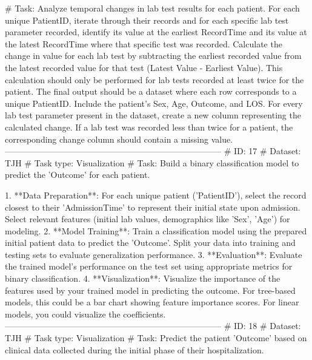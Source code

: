 \begin{tcolorbox}[colback=cadmiumgreen!5!white,colframe=forestgreen!75!white,breakable,title=\textit{Generated analytical tasks in task 4.}]
\begin{VerbatimWrap}
# Task: Analyze temporal changes in lab test results for each patient. For each unique PatientID, iterate through their records and for each specific lab test parameter recorded, identify its value at the earliest RecordTime and its value at the latest RecordTime where that specific test was recorded. Calculate the change in value for each lab test by subtracting the earliest recorded value from the latest recorded value for that test (Latest Value - Earliest Value). This calculation should only be performed for lab tests recorded at least twice for the patient. The final output should be a dataset where each row corresponds to a unique PatientID. Include the patient's Sex, Age, Outcome, and LOS. For every lab test parameter present in the dataset, create a new column representing the calculated change. If a lab test was recorded less than twice for a patient, the corresponding change column should contain a missing value.
-----------------------------------------------------------------------------
# ID: 17  
# Dataset: TJH 
# Task type: Visualization
# Task: Build a binary classification model to predict the 'Outcome' for each patient.
 
 1. **Data Preparation**: For each unique patient ('PatientID'), select the record closest to their 'AdmissionTime' to represent their initial state upon admission. Select relevant features (initial lab values, demographics like 'Sex', 'Age') for modeling.
 2. **Model Training**: Train a classification model using the prepared initial patient data to predict the 'Outcome'. Split your data into training and testing sets to evaluate generalization performance.
 3. **Evaluation**: Evaluate the trained model's performance on the test set using appropriate metrics for binary classification.
 4. **Visualization**: Visualize the importance of the features used by your trained model in predicting the outcome. For tree-based models, this could be a bar chart showing feature importance scores. For linear models, you could visualize the coefficients.
-----------------------------------------------------------------------------
# ID: 18  
# Dataset: TJH 
# Task type: Visualization
# Task: Predict the patient 'Outcome' based on clinical data collected during the initial phase of their hospitalization.
 

\end{VerbatimWrap}
\end{tcolorbox}
